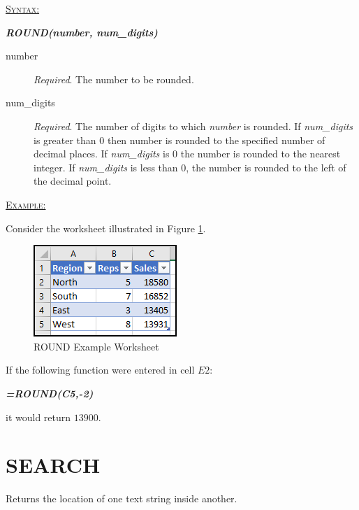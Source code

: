 \begin{addmargin}[1cm]{0cm}
	
	\medskip
	\underline{\textsc{Syntax:}}
	\medskip
	
	{\color{Syntax}
		\noindent\textbf{\textit{ROUND(number, num\_digits)}}
	}
	
	\begin{description}
		\item[number] \textit{Required}. The number to be rounded.
		\item[num\_digits] \textit{Required}. The number of digits to which \textit{number} is rounded. If \textit{num\_digits} is greater than $ 0 $ then number is rounded to the specified number of decimal places. If \textit{num\_digits} is $ 0 $ the number is rounded to the nearest integer. If \textit{num\_digits} is less than $ 0 $, the number is rounded to the left of the decimal point.
	\end{description}

	\medskip
	\noindent\underline{\textsc{Example:}}
	\medskip
	
	\noindent Consider the worksheet illustrated in Figure \ref{apa:ron}.
	
	\begin{figure}[H]
		\centering
		\includegraphics[width=\maxwidth{.45\linewidth}]{gfx/apa_fig01}
		\caption{ROUND Example Worksheet}
		\label{apa:ron}
	\end{figure}
	
	\noindent If the following function were entered in cell $ E2 $:
	
	{\color{Syntax}
		\textit{\textbf{=ROUND(C5,-2)}}
	}
	
	\noindent it would return $ 13900 $.

\end{addmargin}

\section{SEARCH}

Returns the location of one text string inside another.

